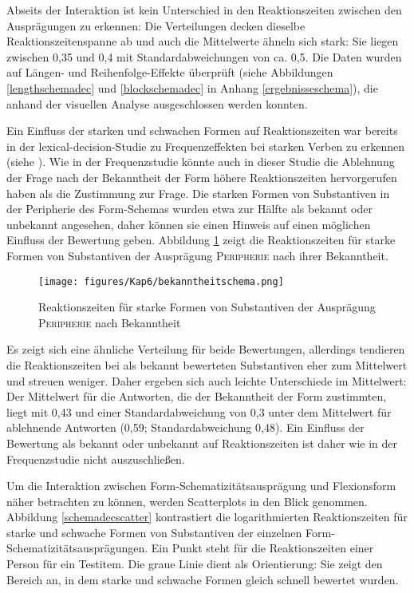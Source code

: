 Abseits der Interaktion ist kein Unterschied in den Reaktionszeiten zwischen den Ausprägungen zu erkennen: Die Verteilungen decken dieselbe Reaktionszeitenspanne ab und auch die Mittelwerte ähneln sich stark: Sie liegen zwischen 0,35 und 0,4 mit Standardabweichungen von ca. 0,5. Die Daten wurden auf Längen- und Reihenfolge-Effekte überprüft (siehe Abbildungen \ref{lengthschemadec} und \ref{blockschemadec} in Anhang \ref{ergebnisseschema}), die anhand der visuellen Analyse ausgeschlossen werden konnten.

Ein Einfluss der starken und schwachen Formen auf Reaktionszeiten war bereits in der lexical-decision-Studie zu Frequenzeffekten bei starken Verben zu erkennen (siehe ). Wie in der Frequenzstudie könnte auch in dieser Studie die Ablehnung der Frage nach der Bekanntheit der Form höhere Reaktionszeiten hervorgerufen haben als die Zustimmung zur Frage. Die starken Formen von Substantiven in der Peripherie des Form-Schemas wurden etwa zur Hälfte als bekannt oder unbekannt angesehen, daher können sie einen Hinweis auf einen möglichen Einfluss der Bewertung geben. Abbildung \ref{bekanntheitlex} zeigt die Reaktionszeiten für starke Formen von Substantiven der Ausprägung \textsc{Peripherie} nach ihrer Bekanntheit.

\begin{figure}
\texttt{[image: figures/Kap6/bekanntheitschema.png]} 
\caption{Reaktionszeiten für starke Formen von Substantiven der Ausprägung \textsc{Peripherie} nach Bekanntheit}
\label{bekanntheitlex}
\end{figure}

Es zeigt sich eine ähnliche Verteilung für beide Bewertungen, allerdings tendieren die Reak\-tionszeiten bei als bekannt bewerteten Substantiven eher zum Mittelwert und streuen weniger. Daher ergeben sich auch leichte Unterschiede im Mittelwert: Der Mittelwert für die Antworten, die der Bekanntheit der Form zustimmten, liegt mit 0,43 und einer Standardabweichung von 0,3 unter dem Mittelwert für ablehnende Antworten (0,59; Standardabweichung 0,48). Ein Einfluss der Bewertung als bekannt oder unbekannt auf Reaktionszeiten ist daher wie in der Frequenzstudie nicht auszuschließen.
  

Um die Interaktion zwischen Form-Schematizitätsausprägung und Flexionsform näher betrachten zu können, werden Scatterplots in den Blick genommen. Abbildung \ref{schemadecscatter} kontrastiert die logarithmierten Reaktionszeiten für starke und schwache Formen von Substantiven der einzelnen Form-Sche\-ma\-ti\-zi\-täts\-aus\-prä\-gun\-gen. Ein Punkt steht für die Reaktionszeiten einer Person für ein Testitem. Die graue Linie dient als Orientierung: Sie zeigt den Bereich an, in dem starke und schwache Formen gleich schnell bewertet wurden. 

